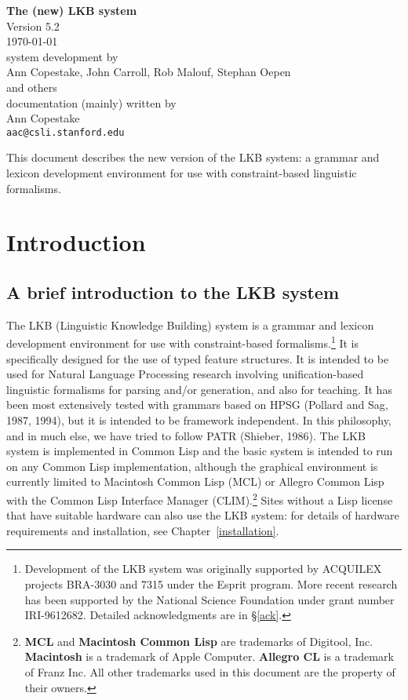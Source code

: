 \documentclass[12pt]{report}
\begin{document}
\vspace*{1in}
\begin{center}
{\Huge\bf The (new) LKB system}\\[0.2in]
Version 5.2\\[0.2in]
\today\\[1in]
system development by\\[0.2in]
{\Large Ann Copestake, John Carroll, Rob Malouf, Stephan Oepen\\ 
and others}\\[0.5in]
documentation (mainly) written by\\[0.2in]
{\Large Ann Copestake}\\
{\tt aac@csli.stanford.edu}\\[0.5in]
\end{center}
This document describes the new version of the LKB system:
a grammar and lexicon development environment for use with
constraint-based linguistic formalisms.

\tableofcontents

\chapter{Introduction}

\section{A brief introduction to the LKB system}

The LKB (Linguistic Knowledge Building)
system is a grammar and lexicon development environment for use with
constraint-based formalisms.\footnote{Development 
of the LKB system was originally supported by ACQUILEX projects
BRA-3030 and 7315 under the Esprit program.  More recent research
has been supported by the
National Science Foundation under grant number IRI-9612682.
Detailed acknowledgments are in \S\ref{ack}.}
It is specifically designed for the use of typed
feature structures.  It is intended to be used for Natural Language Processing
research involving unification-based linguistic formalisms for parsing and/or
generation, and also for teaching.  It has been most extensively tested with
grammars based on HPSG (Pollard and Sag, 1987, 1994), but it is intended to be
framework independent.  In this philosophy, and in much else, 
we have tried to follow PATR
(Shieber, 1986).  The LKB system is implemented in Common Lisp and the
basic system is intended to 
run on any Common Lisp implementation, although the
graphical environment is currently limited to Macintosh Common Lisp (MCL)
or Allegro Common Lisp with the Common Lisp Interface
Manager (CLIM).\footnote{{\bf MCL} and 
{\bf Macintosh Common Lisp} are trademarks of Digitool, Inc.
{\bf Macintosh} is a trademark of Apple Computer.
{\bf Allegro CL} is a trademark of Franz Inc.
All other trademarks used in this document are the property of their
owners.}
Sites without a Lisp license that have suitable hardware can 
also use the LKB system:
for details of hardware requirements and installation, 
see Chapter~\ref{installation}.
\end{document}
